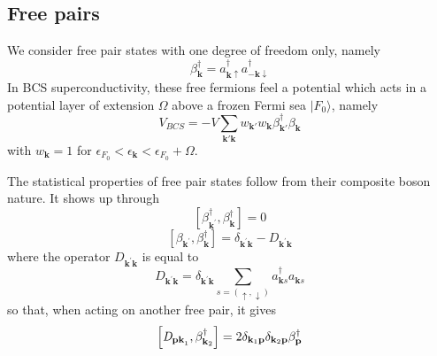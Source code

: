 \documentclass[aps,prb,preprint,groupedaddress,amsmath]{revtex4-1}
\newcommand{\vp}{\ensuremath{\mathbf{p}}}
\newcommand{\vk}{\ensuremath{\mathbf{k}}}
\newcommand{\dg}{\ensuremath{\dagger}}
\begin{document}
\subsection{Free pairs}
We consider free pair states with one degree of freedom only, namely
\begin{equation}\label{eq:beta}
\beta_\vk^\dg=a^\dg_{\vk\uparrow}{}a^\dg_{-\vk\downarrow}
\end{equation}
 In BCS superconductivity, these free fermions feel a potential which acts in a potential layer of extension $\Omega$ above a frozen Fermi sea $|F_0{\rangle}$, namely
\begin{equation}
V_{BCS}=-V\sum_{\vk'\vk}w_{\vk'}w_{\vk}\beta^\dg_{\vk'}\beta^{}_\vk
\label{eq:}
\end{equation}
with $w_\vk=1$ for $\epsilon_{F_0}<\epsilon_\vk<\epsilon_{F_0}+\Omega$. 

The statistical properties of free pair states follow from their composite boson nature. It shows up through
\begin{equation}  
\left[\beta^{\dagger}_{\mathbf{k} ^{\prime}},\beta^{\dagger}_{\mathbf{k} }%
\right]  =0
\end{equation}
\begin{equation}  \label{eq:betacom}
\left[\beta_{\mathbf{k} ^{\prime}},\beta^{\dagger}_{\mathbf{k} }\right] 
=\delta_{\mathbf{k} ^{\prime}\mathbf{k} }-\mathit{D} _{\mathbf{k} ^{\prime}%
\mathbf{k} }
\end{equation}
where the operator $\mathit{D} _{\mathbf{k} ^{\prime}\mathbf{k} }$ is equal to
\begin{equation}\label{eq:D}
\mathit{D} _{\mathbf{k} ^{\prime}\mathbf{k} }=\delta_{\mathbf{k} ^{\prime}\mathbf{k}}\sum_{s=(\uparrow,\downarrow)}a^\dg_{\vk{s}}{}a^{}_{\vk{s}}
\end{equation}
 so that, when acting on another free pair, it gives
\begin{equation}
\left[\mathit{D} _{\mathbf{p}\mathbf{k} ^{}_1},\beta^{\dagger}_{%
\mathbf{k} _2}\right]  =2\delta_{\mathbf{k}_1 \mathbf{p} }\delta_{\mathbf{k}_2 \mathbf{p} }\beta_\vp^\dg
\end{equation}
\end{document}
